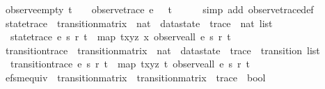 \begin{isabellebody}
\isamarkupfalse%
%
\endisatagproof
{\isafoldproof}%
%
\isadelimproof
\isanewline
%
\endisadelimproof
\isanewline
\isanewline
{}\isamarkupfalse%
\ observe{\isacharunderscore}empty{\isacharcolon}\ {\isachardoublequoteopen}t\ {\isacharequal}\ {\isacharbrackleft}{\isacharbrackright}\ {\isasymLongrightarrow}\ observe{\isacharunderscore}trace\ e\ {}\ {\isacharless}{\isachargreater}\ t\ {\isacharequal}\ {\isacharbrackleft}{\isacharbrackright}{\isachardoublequoteclose}\isanewline
%
\isadelimproof
\ \ %
\endisadelimproof
%
\isatagproof
{}\isamarkupfalse%
\ {\isacharparenleft}simp\ add{\isacharcolon}\ observe{\isacharunderscore}trace{\isacharunderscore}def{\isacharparenright}%
\endisatagproof
{\isafoldproof}%
%
\isadelimproof
\isanewline
%
\endisadelimproof
\isanewline
{}\isamarkupfalse%
\ state{\isacharunderscore}trace\ {\isacharcolon}{\isacharcolon}\ {\isachardoublequoteopen}transition{\isacharunderscore}matrix\ {\isasymRightarrow}\ nat\ {\isasymRightarrow}\ datastate\ {\isasymRightarrow}\ trace\ {\isasymRightarrow}\ nat\ list{\isachardoublequoteclose}\ \isanewline
\ \ {\isachardoublequoteopen}state{\isacharunderscore}trace\ e\ s\ r\ t\ {\isasymequiv}\ map\ {\isacharparenleft}{\isasymlambda}{\isacharparenleft}t{\isacharcomma}x{\isacharcomma}y{\isacharcomma}z{\isacharparenright}{\isachardot}\ x{\isacharparenright}\ {\isacharparenleft}observe{\isacharunderscore}all\ e\ s\ r\ t{\isacharparenright}{\isachardoublequoteclose}\isanewline
\isanewline
{}\isamarkupfalse%
\ transition{\isacharunderscore}trace\ {\isacharcolon}{\isacharcolon}\ {\isachardoublequoteopen}transition{\isacharunderscore}matrix\ {\isasymRightarrow}\ nat\ {\isasymRightarrow}\ datastate\ {\isasymRightarrow}\ trace\ {\isasymRightarrow}\ transition\ list{\isachardoublequoteclose}\ \isanewline
\ \ {\isachardoublequoteopen}transition{\isacharunderscore}trace\ e\ s\ r\ t\ {\isasymequiv}\ map\ {\isacharparenleft}{\isasymlambda}{\isacharparenleft}t{\isacharcomma}x{\isacharcomma}y{\isacharcomma}z{\isacharparenright}{\isachardot}\ t{\isacharparenright}\ {\isacharparenleft}observe{\isacharunderscore}all\ e\ s\ r\ t{\isacharparenright}{\isachardoublequoteclose}\isanewline
\isanewline
{}\isamarkupfalse%
\ efsm{\isacharunderscore}equiv\ {\isacharcolon}{\isacharcolon}\ {\isachardoublequoteopen}transition{\isacharunderscore}matrix\ {\isasymRightarrow}\ transition{\isacharunderscore}matrix\ {\isasymRightarrow}\ trace\ {\isasymRightarrow}\ bool{\isachardoublequoteclose}\ \isanewline

\end{isabellebody}
